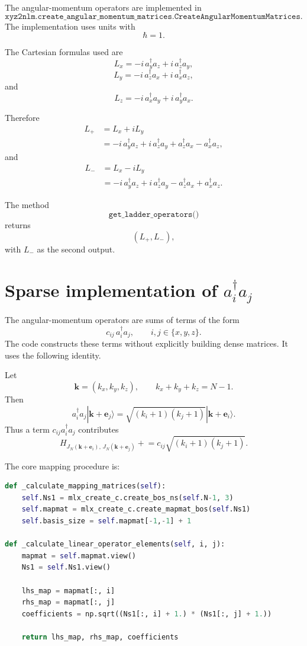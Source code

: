 \documentclass[11pt]{article}
\begin{document}
The angular-momentum operators are implemented in
\[
    \texttt{xyz2nlm.create\_angular\_momentum\_matrices.CreateAngularMomentumMatrices}.
\]
The implementation uses units with
\[
    \hbar=1.
\]

The Cartesian formulas used are
\[
    L_x
    =
    -i\,a_y^\dagger a_z
    +
    i\,a_z^\dagger a_y,
\]
\[
    L_y
    =
    -i\,a_z^\dagger a_x
    +
    i\,a_x^\dagger a_z,
\]
and
\[
    L_z
    =
    -i\,a_x^\dagger a_y
    +
    i\,a_y^\dagger a_x.
\]

Therefore
\[
\begin{aligned}
    L_+
    &=
    L_x+iL_y \\
    &=
    -i\,a_y^\dagger a_z
    +
    i\,a_z^\dagger a_y
    +
    a_z^\dagger a_x
    -
    a_x^\dagger a_z,
\end{aligned}
\]
and
\[
\begin{aligned}
    L_-
    &=
    L_x-iL_y \\
    &=
    -i\,a_y^\dagger a_z
    +
    i\,a_z^\dagger a_y
    -
    a_z^\dagger a_x
    +
    a_x^\dagger a_z.
\end{aligned}
\]

The method
\[
    \texttt{get\_ladder\_operators()}
\]
returns
\[
    (L_+,L_-),
\]
with \(L_-\) as the second output.

\section{Sparse implementation of \(a_i^\dagger a_j\)}

The angular-momentum operators are sums of terms of the form
\[
    c_{ij}\,a_i^\dagger a_j,
    \qquad i,j\in\{x,y,z\}.
\]
The code constructs these terms without explicitly building dense matrices.
It uses the following identity.

Let
\[
    \mathbf k=(k_x,k_y,k_z),
    \qquad
    k_x+k_y+k_z=N-1.
\]
Then
\[
    a_i^\dagger a_j
    |\mathbf k+\mathbf e_j\rangle
    =
    \sqrt{(k_i+1)(k_j+1)}
    |\mathbf k+\mathbf e_i\rangle .
\]
Thus a term \(c_{ij}a_i^\dagger a_j\) contributes
\[
    H_{J_N(\mathbf k+\mathbf e_i),\,J_N(\mathbf k+\mathbf e_j)}
    \mathrel{+}=
    c_{ij}\sqrt{(k_i+1)(k_j+1)}.
\]

The core mapping procedure is:

\begin{lstlisting}[language=Python]
def _calculate_mapping_matrices(self):
    self.Ns1 = mlx_create_c.create_bos_ns(self.N-1, 3)
    self.mapmat = mlx_create_c.create_mapmat_bos(self.Ns1)
    self.basis_size = self.mapmat[-1,-1] + 1

def _calculate_linear_operator_elements(self, i, j):
    mapmat = self.mapmat.view()
    Ns1 = self.Ns1.view()

    lhs_map = mapmat[:, i]
    rhs_map = mapmat[:, j]
    coefficients = np.sqrt((Ns1[:, i] + 1.) * (Ns1[:, j] + 1.))

    return lhs_map, rhs_map, coefficients
\end{lstlisting}
\end{document}
